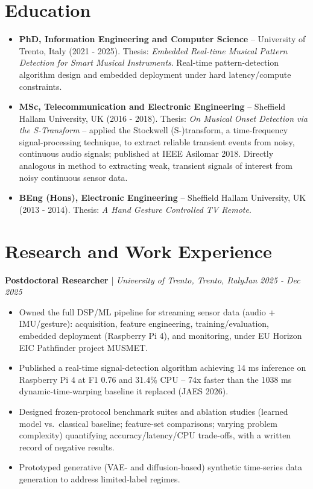 \documentclass[11pt]{article}
\newenvironment{cvrole}[5]{%
  \par\noindent\textbf{\large #1} | \textit{\small #2, #3}\hfill \textit{\small #4 - #5}\par
  \begin{itemize}[leftmargin=2em, itemsep=-0.3em, topsep=-0.5em]%
}{%
  \end{itemize}\par\noindent\mbox{}\par\vspace{0.1em}%
}
\begin{document}
\section*{Education}
\begin{itemize}[leftmargin=2em, itemsep=-0.3em, topsep=0.2em]
    \item \textbf{PhD, Information Engineering and Computer Science} -- University of Trento, Italy (2021 - 2025). Thesis: \textit{Embedded Real-time Musical Pattern Detection for Smart Musical Instruments}. Real-time pattern-detection algorithm design and embedded deployment under hard latency/compute constraints.
    \item \textbf{MSc, Telecommunication and Electronic Engineering} -- Sheffield Hallam University, UK (2016 - 2018). Thesis: \textit{On Musical Onset Detection via the S-Transform} -- applied the Stockwell (S-)transform, a time-frequency signal-processing technique, to extract reliable transient events from noisy, continuous audio signals; published at IEEE Asilomar 2018. Directly analogous in method to extracting weak, transient signals of interest from noisy continuous sensor data.
    \item \textbf{BEng (Hons), Electronic Engineering} -- Sheffield Hallam University, UK (2013 - 2014). Thesis: \textit{A Hand Gesture Controlled TV Remote}.
\end{itemize}

\section*{Research and Work Experience}

\begin{cvrole}{Postdoctoral Researcher}{University of Trento}{Trento, Italy}{Jan 2025}{Dec 2025}
    \item Owned the full DSP/ML pipeline for streaming sensor data (audio + IMU/gesture): acquisition, feature engineering, training/evaluation, embedded deployment (Raspberry Pi 4), and monitoring, under EU Horizon EIC Pathfinder project MUSMET.
    \item Published a real-time signal-detection algorithm achieving 14 ms inference on Raspberry Pi 4 at F1 0.76 and 31.4\% CPU -- 74x faster than the 1038 ms dynamic-time-warping baseline it replaced (JAES 2026).
    \item Designed frozen-protocol benchmark suites and ablation studies (learned model vs.\ classical baseline; feature-set comparisons; varying problem complexity) quantifying accuracy/latency/CPU trade-offs, with a written record of negative results.
    \item Prototyped generative (VAE- and diffusion-based) synthetic time-series data generation to address limited-label regimes.
\end{cvrole}
\end{document}
